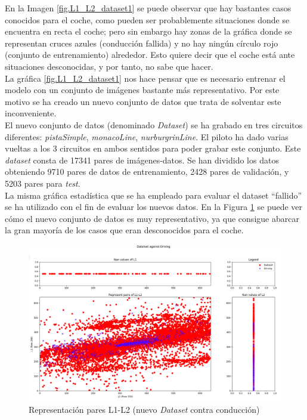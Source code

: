 En la Imagen \ref{fig.L1_L2_dataset1} se puede observar que hay bastantes casos conocidos para el coche, como pueden ser probablemente situaciones donde se encuentra en recta el coche; pero sin embargo hay zonas de la gráfica donde se representan cruces azules (conducción fallida) y no hay ningún círculo rojo (conjunto de entrenamiento) alrededor. Esto quiere decir que el coche está ante situaciones desconocidas, y por tanto, no sabe que hacer. \\

La gráfica \ref{fig.L1_L2_dataset1} nos hace pensar que es necesario entrenar el modelo con un conjunto de imágenes bastante más representativo. Por este motivo se ha creado un nuevo conjunto de datos que trata de solventar este inconveniente.\\

El nuevo conjunto de datos (denominado \textit{Dataset}) se ha grabado en tres circuitos diferentes: \textit{pistaSimple}, \textit{monacoLine}, \textit{nurburgrinLine}. El piloto ha dado varias vueltas a los 3 circuitos en ambos sentidos para poder grabar este conjunto. Este \textit{dataset} consta de 17341 pares de imágenes-datos. Se han dividido los datos obteniendo 9710 pares de datos de entrenamiento, 2428 pares de validación, y 5203 pares para \textit{test}.\\

La misma gráfica estadística que se ha empleado para evaluar el dataset ``fallido'' se ha utilizado con el fin de evaluar los nuevos datos. En la Figura \ref{fig.L1_L2_dataset3} se puede ver cómo el nuevo conjunto de datos es muy representativo, ya que consigue abarcar la gran mayoría de los casos que eran desconocidos para el coche.\\

\begin{figure}
  \begin{center}
    \includegraphics[width=1\textwidth]{figures/Infraestructura/L1_L2_Dataset3.png}
		\caption{Representación pares L1-L2 (nuevo \textit{Dataset} contra conducción)}
		\label{fig.L1_L2_dataset3}
		\end{center}
\end{figure}


